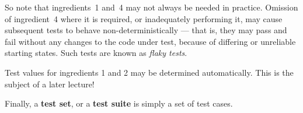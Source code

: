 So note that ingredients~1 and~4 may not always be needed in practice. Omission
of ingredient~4 where it is required, or inadequately performing it, may cause
subsequent tests to behave non-deterministically --- that is, they may pass and
fail without any changes to the code under test, because of differing or
unreliable starting states. Such tests are known as {\it flaky tests}.

Test values for ingredients 1 and 2 may be determined automatically. This is the
subject of a later lecture!


Finally, a {\bf test set}, or a {\bf test suite} is simply a set of test cases.

